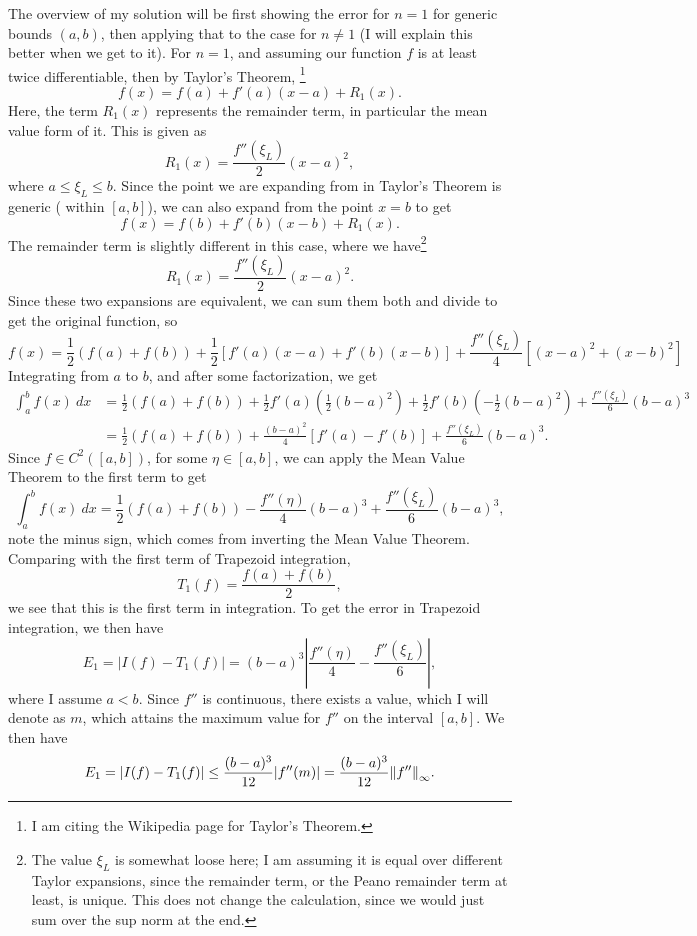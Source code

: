 \begin{solution}

    The overview of my solution will be first showing the error for $n = 1$ for generic bounds $(a, b)$, then applying that to the case for $n \neq 1$ (I will explain this better when we get to it). For $n = 1$, and assuming our function $f$ is at least twice differentiable, then by Taylor's Theorem, \footnote{I am citing the Wikipedia page for Taylor's Theorem.} 
    \[f(x) = f(a) + f'(a)(x - a) + R_1(x).\]
    Here, the term $R_1(x)$ represents the remainder term, in particular the mean value form of it. This is given as 
    \[R_1(x) = \frac{f''(\xi_L)}{2}(x - a)^2,\]
    where $a \leq \xi_L \leq b$. Since the point we are expanding from in Taylor's Theorem is generic ( within $[a, b]$), we can also expand from the point $x = b$ to get 
    \[f(x) = f(b) + f'(b)(x - b) + R_1(x).\]
    The remainder term is slightly different in this case, where we have\footnote{The value $\xi_L$ is somewhat loose here; I am assuming it is equal over different Taylor expansions, since the remainder term, or the Peano remainder term at least, is unique. This does not change the calculation, since we would just sum over the sup norm at the end.} 
    \[R_1(x) = \frac{f''(\xi_L)}{2}(x - a)^2.\]
    Since these two expansions are equivalent, we can sum them both and divide to get the original function, so
    \[f(x) = \frac{1}{2}(f(a) + f(b)) + \frac{1}{2}\left[f'(a)(x - a) +f'(b)(x - b)\right] + \frac{f''(\xi_L)}{4}[(x - a)^2 + (x - b)^2]\]
    Integrating from $a$ to $b$, and after some factorization, we get 
    \begin{align*}
        \int_a^b f(x) \ dx &= \frac{1}{2}(f(a) + f(b)) + \frac{1}{2}f'(a) \left( \frac{1}{2}(b - a)^2\right) + \frac{1}{2}f'(b) \left( -\frac{1}{2}(b - a)^2\right) + \frac{f''(\xi_L)}{6}(b-a)^3\\
        &= \frac{1}{2}(f(a) + f(b))+ \frac{(b - a)^2}{4}[f'(a) - f'(b)] + \frac{f''(\xi_L)}{6}(b - a)^3.
    \end{align*}
    Since $f \in C^2([a, b])$, for some $\eta \in [a, b]$, we can apply the Mean Value Theorem to the first term to get
    \[\int_a^b f(x) \ dx = \frac{1}{2}(f(a) + f(b)) - \frac{f''(\eta)}{4}(b - a)^3 + \frac{f''(\xi_L)}{6}(b - a)^3,\]
    note the minus sign, which comes from inverting the Mean Value Theorem. Comparing with the first term of Trapezoid integration, 
    \[T_1(f) = \frac{f(a) + f(b)}{2},\]
    we see that this is the first term in integration. To get the error in Trapezoid integration, we then have
    \[E_1 = |I(f) - T_1(f)| = (b - a)^3\left|\frac{f''(\eta)}{4} - \frac{f''(\xi_L)}{6}\right|,\]
    where I assume $a < b$. Since $f''$ is continuous, there exists a value, which I will denote as $m$, which attains the maximum value for $f''$ on the interval $[a, b]$. We then have
    \[E_1 = |I(f) - T_1(f)| \leq  \frac{(b - a)^3}{12}|f''(m)| = \frac{(b - a)^3}{12}\norm{f''}_\infty.\]
    

\end{solution}
